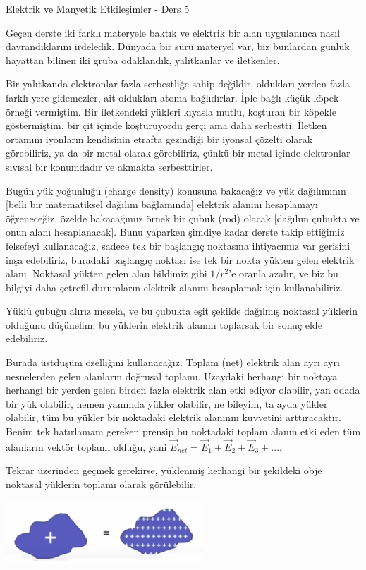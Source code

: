 \documentclass[12pt,fleqn]{article}\usepackage{../../common}
\begin{document}
Elektrik ve Manyetik Etkileşimler - Ders 5

Geçen derste iki farklı materyele baktık ve elektrik bir alan uygulanınca
nasıl davrandıklarını irdeledik. Dünyada bir sürü materyel var, biz
bunlardan günlük hayattan bilinen iki gruba odaklandık, yalıtkanlar ve
iletkenler. 

Bir yalıtkanda elektronlar fazla serbestliğe sahip değildir, oldukları
yerden fazla farklı yere gidemezler, ait oldukları atoma bağlıdırlar. İple
bağlı küçük köpek örneği vermiştim. Bir iletkendeki yükleri kıyasla mutlu,
koşturan bir köpekle göstermiştim, bir çit içinde koşturuyordu gerçi ama
daha serbestti. İletken ortamını iyonların kendisinin etrafta gezindiği bir
iyonsal çözelti olarak görebiliriz, ya da bir metal olarak görebiliriz,
çünkü bir metal içinde elektronlar sıvısal bir konumdadır ve akmakta
serbesttirler.

Bugün yük yoğunluğu (charge density) konusuna bakacağız ve yük dağılımının
[belli bir matematiksel dağılım bağlamında] elektrik alanını hesaplamayı
öğreneceğiz, özelde bakacağımız örnek bir çubuk (rod) olacak [dağılım
çubukta ve onun alanı hesaplanacak]. Bunu yaparken şimdiye kadar derste
takip ettiğimiz felsefeyi kullanacağız, sadece tek bir başlangıç noktasına
ihtiyacımız var gerisini inşa edebiliriz, buradaki başlangıç noktası ise
tek bir nokta yükten gelen elektrik alanı. Noktasal yükten gelen alan
bildimiz gibi $1/r^2$'e oranla azalır, ve biz bu bilgiyi daha çetrefil
durumların elektrik alanını hesaplamak için kullanabiliriz.

Yüklü çubuğu alırız mesela, ve bu çubukta eşit şekilde dağılmış noktasal
yüklerin olduğunu düşünelim, bu yüklerin elektrik alanını toplarsak bir
sonuç elde edebiliriz.  

Burada üstdüşüm özelliğini kullanacağız. Toplam (net) elektrik alan ayrı
ayrı nesnelerden gelen alanların doğrusal toplamı. Uzaydaki herhangi bir
noktaya herhangi bir yerden gelen birden fazla elektrik alan etki ediyor
olabilir, yan odada bir yük olabilir, hemen yanımda yükler olabilir, ne
bileyim, ta ayda yükler olabilir, tüm bu yükler bir noktadaki elektrik
alanının kuvvetini arttıracaktır. Benim tek hatırlamam gereken prensip bu
noktadaki toplam alanın etki eden tüm alanların vektör toplamı olduğu,
yani $\vec{E}_{net} = \vec{E}_1 + \vec{E}_2 + \vec{E}_3 + ...$. 

Tekrar üzerinden geçmek gerekirse, yüklenmiş herhangi bir şekildeki obje
noktasal yüklerin toplamı olarak görülebilir,

\includegraphics[width=20em]{05_01.png}
\end{document}
